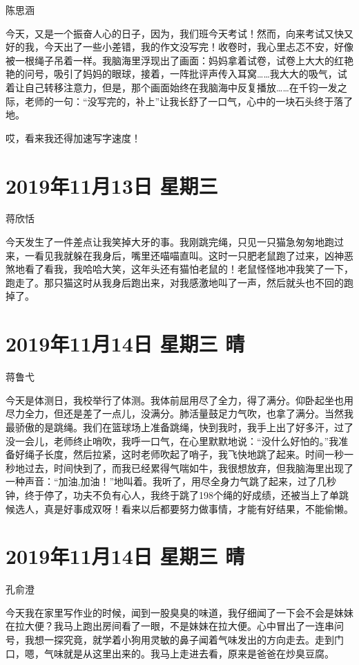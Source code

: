 陈思涵

今天，又是一个振奋人心的日子，因为，我们班今天考试！然而，向来考试又快又好的我，今天出了一些小差错，我的作文没写完！收卷时，我心里忐忑不安，好像被一根绳子吊着一样。我脑海里浮现出了画面：妈妈拿着试卷，试卷上大大的红艳艳的问号，吸引了妈妈的眼球，接着，一阵批评声传入耳窝\ldots\ldots 我大大的吸气，试着让自己转移注意力，但是，那个画面始终在我脑海中反复播放\ldots\ldots 在千钧一发之际，老师的一句：``没写完的，补上''让我长舒了一口气，心中的一块石头终于落了地。

哎，看来我还得加速写字速度！

\section{2019年11月13日 星期三}

蒋欣恬

今天发生了一件差点让我笑掉大牙的事。我刚跳完绳，只见一只猫急匆匆地跑过来，一看见我就躲在我身后，嘴里还喵喵直叫。这时一只肥老鼠跑了过来，凶神恶煞地看了看我，我哈哈大笑，这年头还有猫怕老鼠的！老鼠怪怪地冲我笑了一下，跑走了。那只猫这时从我身后跑出来，对我感激地叫了一声，然后就头也不回的跑掉了。

\section{2019年11月14日 星期三 晴}

蒋鲁弋

今天是体测日，我校举行了体测。我体前屈用尽了全力，得了满分。仰卧起坐也用尽力全力，但还是差了一点儿，没满分。肺活量鼓足力气吹，也拿了满分。当然我最骄傲的是跳绳。我们在篮球场上准备跳绳，快到我时，我手上出了好多汗，过了没一会儿，老师终止哨吹，我呼一口气，在心里默默地说：``没什么好怕的。''我准备好绳子长度，然后拉紧，这时老师吹起了哨子，我飞快地跳了起来。时间一秒一秒地过去，时间快到了，而我已经累得气喘如牛，我很想放弃，但我脑海里出现了一种声音：``加油,加油！''地叫着。我听了，用尽全身力气跳了起来，过了几秒钟，终于停了，功夫不负有心人，我终于跳了198个绳的好成绩，还被当上了单跳候选人，真是好事成双呀！看来以后都要努力做事情，才能有好结果，不能偷懒。

\section{2019年11月14日 星期三 晴}

孔俞澄

今天我在家里写作业的时候，闻到一股臭臭的味道，我仔细闻了一下会不会是妹妹在拉大便？我马上跑出房间看了一眼，不是妹妹在拉大便。心中冒出了一连串问号，我想一探究竟，就学着小狗用灵敏的鼻子闻着气味发出的方向走去。走到门口，嗯，气味就是从这里出来的。我马上走进去看，原来是爸爸在炒臭豆腐。

